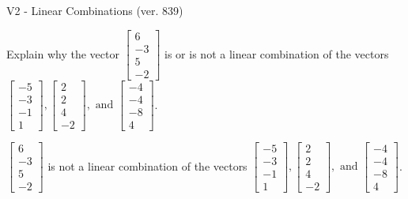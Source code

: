 \begin{exercise}
  \begin{exerciseTitle}V2 - Linear Combinations (ver. 839)\end{exerciseTitle}
  \begin{exerciseStatement}
    Explain why the vector \(\left[\begin{array}{c}
6 \\
-3 \\
5 \\
-2
\end{array}\right]\)  is or is not a linear 
	combination of the vectors \(\left[\begin{array}{c}
-5 \\
-3 \\
-1 \\
1
\end{array}\right] , \left[\begin{array}{c}
2 \\
2 \\
4 \\
-2
\end{array}\right] , \text{ and } \left[\begin{array}{c}
-4 \\
-4 \\
-8 \\
4
\end{array}\right]\).
	


  \end{exerciseStatement}
  \begin{exerciseAnswer}
   \(\left[\begin{array}{c}
6 \\
-3 \\
5 \\
-2
\end{array}\right]\) 
  	 is not  
	a linear combination of the vectors \(\left[\begin{array}{c}
-5 \\
-3 \\
-1 \\
1
\end{array}\right] , \left[\begin{array}{c}
2 \\
2 \\
4 \\
-2
\end{array}\right] , \text{ and } \left[\begin{array}{c}
-4 \\
-4 \\
-8 \\
4
\end{array}\right]\).

	
  


  \end{exerciseAnswer}
\end{exercise}